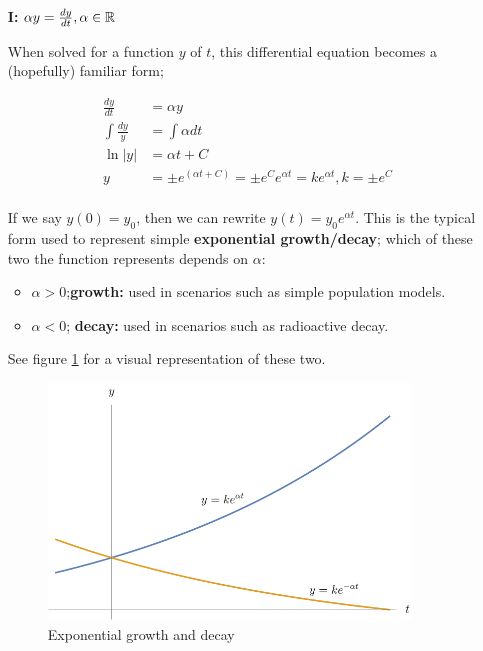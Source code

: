 \documentclass[12pt]{article}
\begin{document}
\begin{itemize}
    \item[\textbf{I:}] $\alpha y = \frac{dy}{dt}, \alpha \in \mathbb{R}$ 
    
    When solved for a function $y$ of $t$, this differential equation becomes a (hopefully) familiar form;
    
    \begin{equation}
        \begin{split}
            \frac{dy}{dt} &= \alpha y\\
            \int \frac{dy}{y} &= \int \alpha dt\\
            \ln|y|&=\alpha t + C\\
            y &= \pm e^{(\alpha t + C)} = \pm e^C e^{\alpha t} = k e^{\alpha t}, k = \pm e^C\\
        \end{split}
    \end{equation}
    
    If we say $y(0) = y_0$, then we can rewrite $y(t)=y_0e^{\alpha t}$. This is the typical form used to represent simple \textbf{exponential growth/decay}; which of these two the function represents depends on $\alpha$:
    
    \begin{itemize}
        \item $\alpha > 0$;\textbf{growth:} used in scenarios such as simple population models.
        \item $\alpha < 0$; \textbf{decay:} used in scenarios such as radioactive decay.
    \end{itemize}
    
    See figure \ref{fig:exponentialgrowthndecay} for a visual representation of these two.
    
    \begin{figure}[!ht]
        \centering
        \includegraphics[width=9.6cm]{misc/exponentialgnd.png}
        \caption{Exponential growth and decay}
        \label{fig:exponentialgrowthndecay}%
    \end{figure}
    

\end{itemize}
\end{document}

